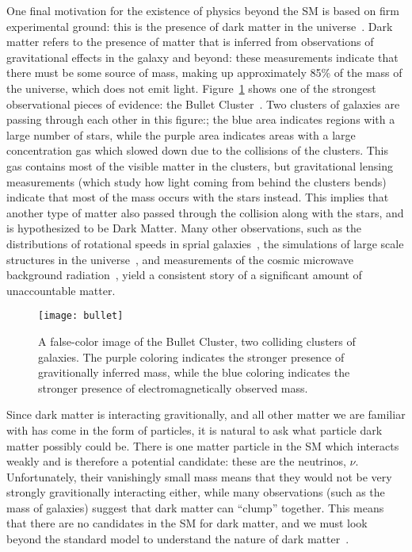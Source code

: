 One final motivation for the existence of physics beyond the SM is based on firm experimental ground: this is the presence of dark matter in the universe~\cite{Jungman}. Dark matter refers to the presence of matter that is inferred from observations of gravitational effects in the galaxy and beyond: these measurements indicate that there must be some source of mass, making up approximately 85\% of the mass of the universe, which does not emit light. Figure~\ref{fig:susy:bullet} shows one of the strongest observational pieces of evidence: the Bullet Cluster~\cite{Tucker:1998tp,Markevitch:2003at}. Two clusters of galaxies are passing through each other in this figure:; the blue area indicates regions with a large number of stars, while the purple area indicates areas with a large concentration gas which slowed down due to the collisions of the clusters. This gas contains most of the visible matter in the clusters, but gravitational lensing measurements (which study how light coming from behind the clusters bends) indicate that most of the mass occurs with the stars instead. This implies that another type of matter also passed through the collision along with the stars, and is hypothesized to be Dark Matter. Many other observations, such as the distributions of rotational speeds in sprial galaxies~\cite{Rubin}, the simulations of large scale structures in the universe~\cite{Springel:2005nw}, and measurements of the cosmic microwave background radiation~\cite{Ade:2015xua}, yield a consistent story of a significant amount of unaccountable matter.



\begin{figure}
\centering
\texttt{[image: bullet]}
\label{fig:susy:bullet}
\caption{A false-color image of the Bullet Cluster, two colliding clusters of galaxies. The purple coloring indicates the stronger presence of gravitionally inferred mass, while the blue coloring indicates the stronger presence of electromagnetically observed mass.}
\end{figure}


Since dark matter is interacting gravitionally, and all other matter we are familiar with has come in the form of particles, it is natural to ask what particle dark matter possibly could be. There is one matter particle in the SM which interacts weakly and is therefore a potential candidate: these are the neutrinos, $\nu$. Unfortunately, their vanishingly small mass means that they would not be very strongly gravitionally interacting either, while many observations (such as the mass of galaxies) suggest that dark matter can ``clump'' together. This means that there are no candidates in the SM for dark matter, and we must look beyond the standard model to understand the nature of dark matter~\cite{Jungman}.


